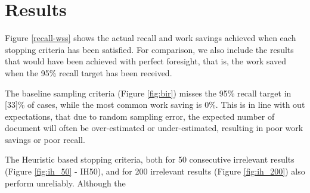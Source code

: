 \documentclass{bmcart}
\begin{document}
	\section*{Results}
	
	Figure \ref{recall-wss} shows the actual recall and work savings achieved when each stopping criteria has been satisfied. 
	For comparison, we also include the results that would have been achieved with perfect foresight, that is, the work saved when the 95\% recall target has been received.
	
	The baseline sampling criteria (Figure \ref{fig:bir}) misses the 95\% recall target in [33]\% of cases, while the most common work saving is 0\%. This is in line with out expectations, that due to random sampling error, the expected number of document will often be over-estimated or under-estimated, resulting in poor work savings or poor recall.
	
	The Heuristic based stopping criteria, both for 50 consecutive irrelevant results (Figure \ref{fig:ih_50} - IH50), and for 200 irrelevant results (Figure \ref{fig:ih_200}) also perform unreliably. Although the 
\end{document}
